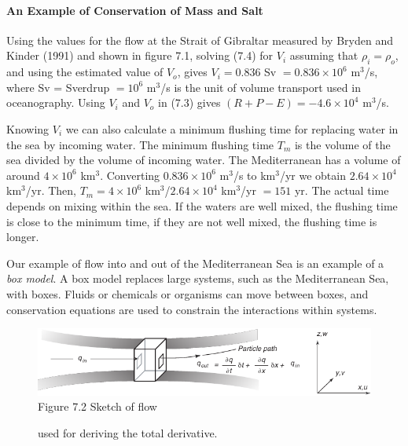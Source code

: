 \paragraph{An Example of Conservation of Mass and Salt}
Using the values for the flow at the Strait of Gibraltar measured by
Bryden and Kinder (1991) and shown in figure 7.1, solving (7.4) for
$V_i$ assuming that $\rho_i = \rho_o$, and using the estimated value
of $V_o$, gives $V_i = 0.836$ Sv $= 0.836 \times 10^6$ m$^3$/s, where
Sv = Sverdrup $= 10^6$ m$^3$/s is the unit of volume
transport used in oceanography. Using $V_i$
and $V_o$ in (7.3) gives $(R + P - E) = - 4.6 \times 10^4$ m$^3$/s.

Knowing $V_i$ we can also calculate a minimum flushing time for
replacing water in the sea by incoming water. The minimum flushing
time $T_m$ is the volume of the sea divided by the volume of incoming
water. The Mediterranean has a volume of around $4 \times 10^6$
km$^3$. Converting $0.836 \times 10^6$ m$^3$/s to km$^3$/yr we obtain
$2.64 \times10^4$ km$^3$/yr. Then, $T_m = 4 \times 10^6$ km$^3$/$2.64
\times 10^4$ km$^3$/yr $= 151$ yr. The actual time depends on
mixing within the sea. If the waters
are well mixed, the flushing time is close to the minimum time, if
they are not well mixed, the flushing time is longer.

Our example of flow into and out of the Mediterranean Sea is an
example of a \textit{box model}. A box model
replaces large systems, such as the Mediterranean Sea, with
boxes. Fluids or chemicals or organisms can move between boxes, and
conservation equations are used to constrain the interactions within
systems.

\begin{figure}[b!]
\includegraphics{pics/derivativesketch}
\centering
\footnotesize
Figure 7.2 Sketch of flow \rule{0mm}{4ex}used for deriving the total
derivative.

\label{fig:derivativesketch}
\vspace{-3ex}
\end{figure}


